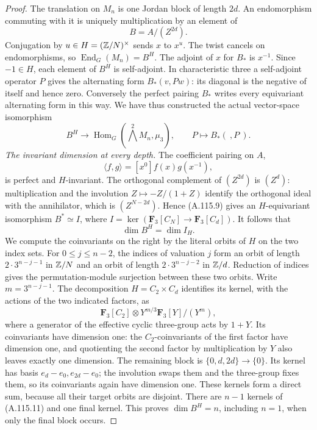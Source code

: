 \begin{proof}
The translation on $M_n$ is one Jordan block of
length $2d$.  An endomorphism commuting with it is
uniquely multiplication by an element of
\[
                         B=A/(Z^{2d}).
\tag{A.115.7}
\]
Conjugation by $u\in H=(\mathbb Z/N)^\times$ sends
$x$ to $x^u$.  The twist cancels on endomorphisms,
so $\operatorname{End}_G(M_n)=B^H$.
The adjoint of $x$ for $B_*$ is $x^{-1}$.
Since $-1\in H$, each element of $B^H$ is
self-adjoint.  In characteristic three a
self-adjoint operator $P$ gives the alternating
form $B_*(v,Pw)$: its diagonal is the negative
of itself and hence zero.  Conversely the perfect
pairing $B_*$ writes every equivariant alternating
form in this way.  We have thus constructed the
actual vector-space isomorphism
\[
 B^H\longrightarrow
       \operatorname{Hom}_G(\textstyle\bigwedge^2M_n,\mu_3),
                 \qquad P\longmapsto B_*(\ ,P\ ).
\tag{A.115.8}
\]
\emph{The invariant dimension at every depth.}
The coefficient pairing on $A$,
\[
       \langle f,g\rangle=[x^0]f(x)g(x^{-1}),
\tag{A.115.9}
\]
is perfect and $H$-invariant.  The orthogonal
complement of $(Z^{2d})$ is $(Z^d)$: multiplication
and the involution $Z\mapsto-Z/(1+Z)$ identify the
orthogonal ideal with the annihilator, which is
$(Z^{N-2d})$.
Hence (A.115.9) gives an $H$-equivariant isomorphism
$B^*\simeq I$, where
$I=\ker(\mathbf F_3[C_N]\to\mathbf F_3[C_d])$.
It follows that
\[
                         \dim B^H=\dim I_H.
\tag{A.115.10}
\]
We compute the coinvariants on the right by the
literal orbits of $H$ on the two index sets.
For $0\leq j\leq n-2$, the indices of valuation
$j$ form an orbit of length $2\cdot3^{n-j-1}$
in $\mathbb Z/N$ and an orbit of length
$2\cdot3^{n-j-2}$ in $\mathbb Z/d$.
Reduction of indices gives the permutation-module
surjection between these two orbits.
Write $m=3^{n-j-1}$.
The decomposition $H=C_2\times C_d$ identifies its
kernel, with the actions of the two indicated
factors, as
\[
 \mathbf F_3[C_2]\otimes
       Y^{m/3}\mathbf F_3[Y]/(Y^m),
\tag{A.115.11}
\]
where a generator of the effective cyclic
three-group acts by $1+Y$.
Its coinvariants have dimension one: the
$C_2$-coinvariants of the first factor have
dimension one, and quotienting the second
factor by multiplication by $Y$ also leaves
exactly one dimension.
The remaining block is $\{0,d,2d\}\to\{0\}$.
Its kernel has basis $e_d-e_0,e_{2d}-e_0$;
the involution swaps them and the three-group
fixes them, so its coinvariants again have
dimension one.
These kernels form a direct sum, because all
their target orbits are disjoint.  There are
$n-1$ kernels of (A.115.11) and one final
kernel.  This proves $\dim B^H=n$, including
$n=1$, when only the final block occurs.


\end{proof}
